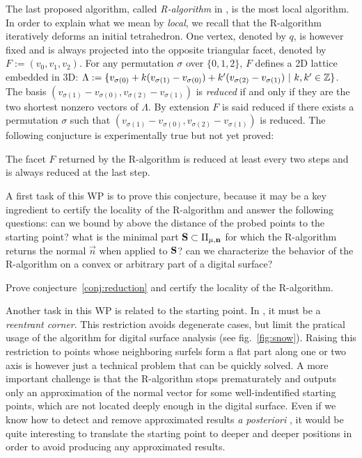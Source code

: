 The last proposed algorithm, called \emph{R-algorithm} in \cite{LPRJMIV2017}, is the most
local algorithm. In order to explain what we mean by \emph{local}, we recall that
the R-algorithm iteratively deforms an initial tetrahedron. One vertex, denoted by $q$,
is however fixed and is always projected into the opposite triangular facet, denoted by
$F := (v_0,v_1,v_2)$. For any permutation $\sigma$ over $\{0,1,2\}$, $F$ defines a 2D
lattice embedded in 3D:
$\Lambda := \{ v_{\sigma(0)} + k (v_{\sigma(1)}-v_{\sigma(0)}) + k' (v_{\sigma(2)}-v_{\sigma(1)}) \ | \ k,k' \in {\ensuremath\mathbb{Z}} \}$. 
The basis $(v_{\sigma(1)}-v_{\sigma(0)}, v_{\sigma(2)}-v_{\sigma(1)})$ is \emph{reduced} if and only
if they are the two shortest nonzero vectors of $\Lambda$. By extension $F$ is said reduced
if there exists a permutation $\sigma$ such that $(v_{\sigma(1)}-v_{\sigma(0)}, v_{\sigma(2)}-v_{\sigma(1)})$
is reduced. The following conjucture is experimentally true but not yet proved:

\begin{Conjecture}
  \label{conj:reduction}
  The facet $F$ returned by the R-algorithm is reduced at least every two steps and
  is always reduced at the last step.  
\end{Conjecture}

A first task of this WP is to prove this conjecture, because it may be
a key ingredient to certify the locality of the R-algorithm and answer
the following questions: can we bound by above the distance of the probed
points to the starting point? 
what is the minimal part $\mathbf{S} \subset \Pi_{\mu,\mathbf{n}}$ for which the
R-algorithm returns the normal $\vec{n}$ when applied to $\mathbf{S}$?
can we characterize the behavior of the R-algorithm on a convex or arbitrary
part of a digital surface?

\begin{Task}
  \label{task:reduction}
  Prove conjecture~\ref{conj:reduction} and certify the locality of the R-algorithm. 
\end{Task}

Another task in this WP is related to the starting point. In \cite{LPRJMIV2017},
it must be a \emph{reentrant corner}. This restriction avoids degenerate cases, but
limit the pratical usage of the algorithm for digital surface analysis
(see fig.~\ref{fig:snow}). Raising this restriction to points whose neighboring
surfels form a flat part along one or two axis is however just a technical
problem that can be quickly solved. A more important challenge is that the R-algorithm
stops prematurately and outputs only an approximation of the normal vector for some
well-indentified starting points, which are not located deeply enough in the digital
surface. Even if we know how to detect and remove approximated results
\emph{a posteriori} \cite{LPRJMIV2017}, it would be quite interesting to translate
the starting point to deeper and deeper positions in order to avoid producing any
approximated results.

